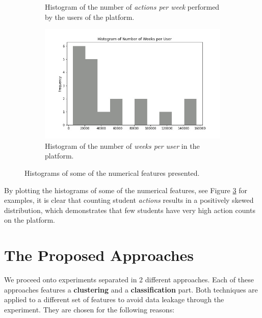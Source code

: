 \documentclass[sigplan,screen]{acmart}
\begin{document}
\begin{figure}
\begin{subfigure}[b]{\linewidth}
         \caption{Histogram of the number of \emph{actions per week} performed by the users of the platform.}
         \label{fig:actions_per_week}
     \end{subfigure}
     \hfill
     \begin{subfigure}[b]{\linewidth}
         \centering
         \includegraphics[width=0.82\linewidth]{reports/figures/histogram_number_of_weeks_per_user.jpg}
         \caption{Histogram of the number of \emph{weeks per user} in the platform.}
         \label{fig:weeks_per_user}
     \end{subfigure}
        \caption{Histograms of some of the numerical features presented.}
        \label{fig:histograms}
\end{figure}

By plotting the histograms of some of the numerical features, see Figure \ref{fig:histograms} for examples, it is clear that counting student \textit{actions} results in a positively skewed distribution, which demonstrates that few students have very high action counts on the platform.

\section{The Proposed Approaches}\label{sec:propapp}

We proceed onto experiments separated in 2 different approaches. Each of these approaches features a \textbf{clustering} and a \textbf{classification} part. Both techniques are applied to a different set of features to avoid data leakage through the experiment. They are chosen for the following reasons:
\end{document}
